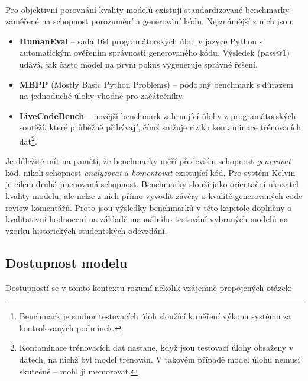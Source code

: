 Pro objektivní porovnání kvality modelů existují standardizované benchmarky\footnote{Benchmark je soubor testovacích úloh sloužící k měření výkonu systému za kontrolovaných podmínek.}
zaměřené na schopnost porozumění a generování kódu.
Nejznámější z nich jsou:

\begin{itemize}
    \item \textbf{HumanEval} \cite{humaneval2021} -- sada 164 programátorských úloh v jazyce Python s automatickým ověřením správnosti generovaného kódu.
    Výsledek (pass@1) udává, jak často model na první pokus vygeneruje správné řešení.

    \item \textbf{MBPP} (Mostly Basic Python Problems) \cite{mbpp2021} -- podobný benchmark s důrazem na jednoduché úlohy vhodné pro začátečníky.

    \item \textbf{LiveCodeBench} \cite{livecodebench2024} -- novější benchmark zahrnující úlohy z programátorských soutěží, které průběžně přibývají,
    čímž snižuje riziko kontaminace trénovacích dat\footnote{Kontaminace trénovacích dat nastane, když jsou testovací úlohy obsaženy v datech, na nichž byl model trénován. V takovém případě model úlohu nemusí skutečně  -- mohl ji memorovat.}.
\end{itemize}

Je důležité mít na paměti, že benchmarky měří především schopnost \emph{generovat} kód, nikoli schopnost \emph{analyzovat} a \emph{komentovat} existující kód.
Pro systém Kelvin je cílem druhá jmenovaná schopnost.
Benchmarky slouží jako orientační ukazatel kvality modelu, ale nelze z nich přímo vyvodit závěry o kvalitě generovaných code review komentářů.
Proto jsou výsledky benchmarků v této kapitole doplněny o kvalitativní hodnocení na základě manuálního testování vybraných modelů na vzorku historických studentských odevzdání.

\subsection{Dostupnost modelu}
\label{subsec:criteria-availability}

Dostupností se v tomto kontextu rozumí několik vzájemně propojených otázek:


